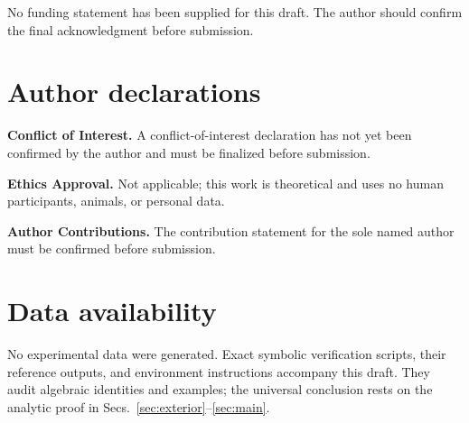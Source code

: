 \documentclass[aip,jmp,amsmath,amssymb,preprint,nofootinbib]{revtex4-2}
\begin{document}
\begin{acknowledgments}
No funding statement has been supplied for this draft.  The author should
confirm the final acknowledgment before submission.
\end{acknowledgments}

\section*{Author declarations}

\textbf{Conflict of Interest.}  A conflict-of-interest declaration has not
yet been confirmed by the author and must be finalized before submission.

\textbf{Ethics Approval.}  Not applicable; this work is theoretical and uses
no human participants, animals, or personal data.

\textbf{Author Contributions.}  The contribution statement for the sole
named author must be confirmed before submission.

\section*{Data availability}

No experimental data were generated.  Exact symbolic verification scripts,
their reference outputs, and environment instructions accompany this draft.
They audit algebraic identities and examples; the universal conclusion rests
on the analytic proof in Secs.~\ref{sec:exterior}--\ref{sec:main}.


\end{document}
